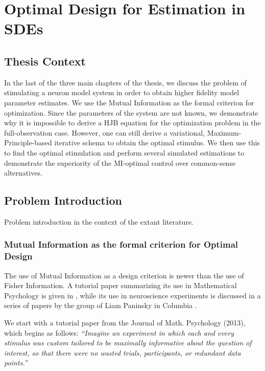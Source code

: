 \chapter{Optimal Design for Estimation in SDEs}
\label{ch:optimal_design}
\graphicspath{{../OptEstimate/}}


 
\section{Thesis Context}
 In the last of the three main chapters of the thesis, we discuss the problem of
 stimulating a neuron model system in order to obtain higher fidelity model
 parameter estimates. We use the Mutual Information as the formal criterion for optimization. Since the
 parameters of the system are not known, we demonstrate why it is impossible to derive a HJB equation for the
 optimization problem in the full-observation case. However, one can still
 derive a variational, Maximum-Principle-based iterative schema to obtain the
 optimal stimulus. We then use this to find the optimal stimulation and perform
 several simulated estimations to demonstrate the superiority of the
 MI-optimal control over common-sense alternatives. 
 
\section{Problem Introduction} 
Problem introduction in the context of the extant literature.

\subsection{Mutual Information as the formal criterion for Optimal Design}
The use of Mutual Information as a design criterion is newer than the use of
Fisher Information. A tutorial paper summarizing its use in Mathematical
Psychology is given in \cite{Myung2013}, while its use in neuroscience
experiments is discussed in a series of papers by the group of Liam Paninsky in
Columbia \cite{Paninski2003,Paninski2005,Lewi2009}. 




We start with a tutorial paper from the Journal of Math. Psychology (2013),
which begins as follows: { \sl ``Imagine an experiment in which each and every
stimulus was custom tailored to be maximally informative about the question of
interest, so that there were no wasted trials, participants, or redundant data
points.''} 

